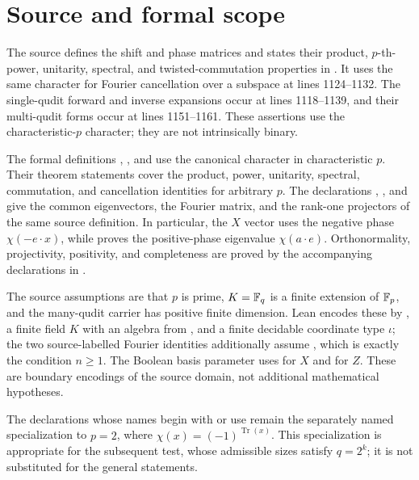 \documentclass[11pt]{article}
\begin{document}
\section{Source and formal scope}
The source defines the shift and phase matrices and states their product,
$p$-th-power, unitarity, spectral, and twisted-commutation properties in
\cite[lines 1056--1095]{Ji2020MIPStar}. It uses the same character for Fourier
cancellation over a subspace at lines 1124--1132.  The single-qudit forward and
inverse expansions occur at lines 1118--1139, and their multi-qudit forms occur
at lines 1151--1161.  These assertions use the characteristic-$p$ character;
they are not intrinsically binary.

The formal definitions , , and
 use the canonical character  in
characteristic $p$.  Their theorem statements cover the product, power,
unitarity, spectral, commutation, and cancellation identities for arbitrary
$p$.  The declarations , , and
 give the common eigenvectors, the Fourier matrix, and the
rank-one projectors of the same source definition.  In particular, the $X$
vector uses the negative phase $\chi(-e\cdot x)$, while
 proves the positive-phase
eigenvalue $\chi(a\cdot e)$.  Orthonormality, projectivity, positivity, and
completeness are proved by the accompanying declarations in
.

The source assumptions are that $p$ is prime, $K=\mathbb{F}_q$ is a finite extension
of $\mathbb{F}_p$, and the many-qudit carrier has positive finite dimension.  Lean
encodes these by , a finite field $K$ with an algebra from
, and a finite decidable coordinate type $\iota$; the two
source-labelled Fourier identities additionally assume , which
is exactly the condition $n\geq 1$.  The Boolean basis parameter uses
 for $X$ and  for $Z$.  These are boundary encodings of
the source domain, not additional mathematical hypotheses.

The declarations whose names begin with  or use
 remain the separately named specialization to $p=2$, where
$\chi(x)=(-1)^{\operatorname{Tr}(x)}$.  This specialization is appropriate for
the subsequent test, whose admissible sizes satisfy $q=2^k$; it is not
substituted for the general statements.
\end{document}
